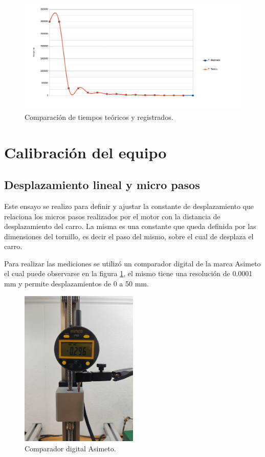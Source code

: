 \begin{figure}[h]
\centering 
\includegraphics[width=1.2\textwidth]{./Figures/tiempo_movimiento_1.png}
\caption{Comparación de tiempos teóricos y registrados.}
\end{figure}



  
\section{Calibración del equipo}
\label{sec:calibración}
\subsection{Desplazamiento lineal y micro pasos}

Este ensayo se realizo para definir y ajustar la constante de desplazamiento que relaciona los micros pasos realizados por el motor con la distancia de desplazamiento del carro. La misma es una constante que queda definida por las dimensiones del tornillo, es decir el paso del mismo,  sobre el cual de desplaza el carro.

Para realizar las mediciones se utilizó un comparador digital de la marca Asimeto\citep{web_asimeto} el cual puede observarse en la figura \ref{fig:micrometro}, el mismo tiene una resolución de 0.0001 mm y permite desplazamientos de 0 a 50 mm.


\begin{figure}[h]
\centering 
\includegraphics[width=0.5\textwidth]{./Figures/micrometro.png}
\caption{Comparador digital Asimeto.}
\label{fig:micrometro}
\end{figure}

